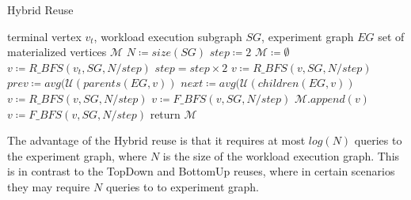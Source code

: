 {\begin{algorithm}[h]
\caption{Hybrid Reuse}\label{algorithm-hybrid}
\begin{algorithmic}[1]
\Require terminal vertex $v_t$, workload execution subgraph  $SG$, experiment graph $EG$ 
\Ensure set of materialized vertices $\mathcal{M}$ 
\State $N \coloneqq size(SG)$
\State $step \coloneqq 2$
\State $\mathcal{M} \coloneqq \emptyset$
\State $v \coloneqq R\_BFS(v_t, SG, N/step)$
		\State $step = step \times 2$
				\State $v \coloneqq R\_BFS(v, SG, N/step)$
				\State $prev \coloneqq avg (\mathcal{U}(parents(EG, v))$
				\State $next \coloneqq avg (\mathcal{U}(children(EG, v))$
						 \State $v \coloneqq R\_BFS(v, SG, N/step)$
				\Else
					\State $v \coloneqq F\_BFS(v, SG, N/step)$
				\EndIf
				\State $\mathcal{M}.append(v)$
				\State $v \coloneqq F\_BFS(v, SG, N/step)$
		\EndIf
\EndWhile
\State return $\mathcal{M}$
\end{algorithmic}
\end{algorithm}
The advantage of the Hybrid reuse is that it requires at most $log(N)$ queries to the experiment graph, where $N$ is the size of the workload execution graph.
This is in contrast to the TopDown and BottomUp reuses, where in certain scenarios they may require $N$ queries to to experiment graph.
}

